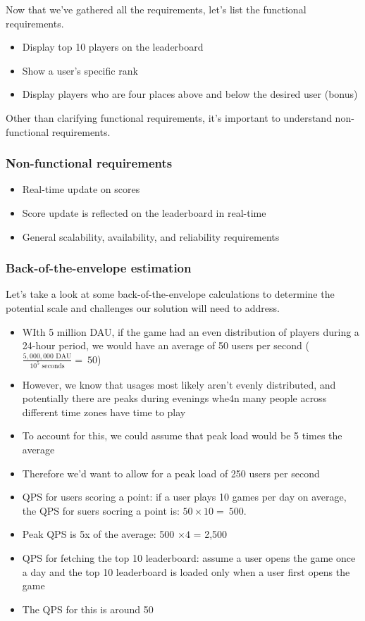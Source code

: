 \documentclass{report}
\theoremstyle{definition}
\let\oldsubsubsection\subsubsection
\renewcommand{\subsubsection}{\oldsubsubsection*}
\begin{document}
Now that we've gathered all the requirements, let's list the functional requirements.

\begin{itemize}
\item
Display top 10 players on the leaderboard
\item
Show a user's specific rank
\item
Display players who are four places above and below the desired user (bonus)
\end{itemize}

Other than clarifying functional requirements, it's important to understand non-functional requirements.

\subsubsection{Non-functional requirements}

\begin{itemize}
\item
Real-time update on scores
\item
Score update is reflected on the leaderboard in real-time
\item
General scalability, availability, and reliability requirements
\end{itemize}

\subsubsection{Back-of-the-envelope estimation}

Let's take a look at some back-of-the-envelope calculations to determine the potential scale and challenges our solution will need to address.

\begin{itemize}
\item
WIth 5 million DAU, if the game had an even distribution of players during a 24-hour period, we would have an average of 50 users per second ($\frac{5,000,000 \text{ DAU}}{10^{5} \text{ seconds}} = ~ 50$)
\item
However, we know that usages most likely aren't evenly distributed, and potentially there are peaks during evenings whe4n many people across different time zones have time to play
\item
To account for this, we could assume that peak load would be 5 times the average
\item
Therefore we'd want to allow for a peak load of 250 users per second
\item
QPS for users scoring a point: if a user plays 10 games per day on average, the QPS for suers socring a point is: $50 \times 10 =~ 500$.
\item
Peak QPS is 5x of the average: 500 $\times 4$ = 2,500
\item
QPS for fetching the top 10 leaderboard: assume a user opens the game once a day and the top 10 leaderboard is loaded only when a user first opens the game
\item
The QPS for this is around 50
\end{itemize}
\end{document}
